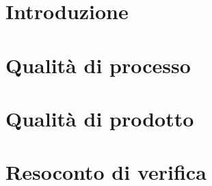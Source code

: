 \documentclass[]{article}
\begin{document}
	
	\newpage
	\tableofcontents
	\newpage
	\listoffigures
	\listoftables
	\newpage

	\section{Introduzione}
	
	\newpage

	\section{Qualità di processo}
	
	\newpage

	\section{Qualità di prodotto}
	
	\clearpage


	\appendix
	\section{Resoconto di verifica}
	
\end{document}
